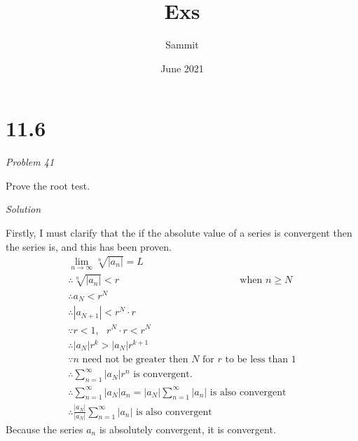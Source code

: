 \documentclass{article}
\title{Exs}
\author{Sammit }
\date{June 2021}
\newcommand{\qst}[1]{\begin{center}\textit{Problem #1}\end{center}}
\newcommand{\sol}{\begin{center}\textit{Solution}\end{center}}
\newcommand{\thf}{\\\therefore}
\begin{document}
\maketitle

\section*{11.6}
\qst{41}
Prove the root test.
\sol

Firstly, I must clarify that the if the absolute value of a series is convergent then the series is, and this has been proven.
\begin{gather*}
\lim_{n\to\infty}\sqrt[n]{|a_n|}=L
\\\therefore \sqrt[n]{|a_n|}<r\text{ }\text{ }\text{ }\text{ }\text{ }\text{ }\text{ }\text{ }\text{ }\text{ }\text{ }\text{ }\text{ }\text{ }\text{ }\text{ }\text{ }\text{ }\text{  when }n\geq N
\\\therefore a_N<r^N
\thf |a_{N+1}|<r^N \cdot r
\\\because r<1,\text{ } r^N \cdot r<r^N
\thf |a_{N}|r^{k}>|a_N|r^{k+1}
\\\because n \text{ need not be greater then }N\text{ for }r\text{ to be less than }1
\\\therefore \sum^{\infty}_{n=1}|a_N|r^{n} \text{ is convergent.}
\thf \sum^{\infty}_{n=1}|a_N|a_n =|a_N|\sum^{\infty}_{n=1}|a_n| \text{ is also convergent}
\thf\frac{|a_N|}{|a_N|}\sum^{\infty}_{n=1}|a_n| \text{ is also convergent}
\end{gather*}
Because the series $a_n$ is absolutely convergent, it is convergent.
\end{document}
